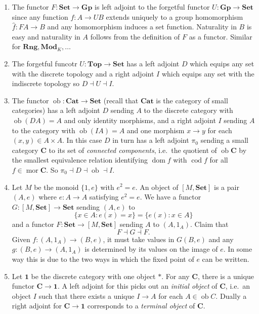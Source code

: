 \documentclass[a4paper]{article}
\renewcommand{\c}[1]{\mathbf{#1}}
\DeclareMathOperator{\ob}{ob}
\DeclareMathOperator{\mor}{mor}
\DeclareMathOperator{\dom}{dom}
\DeclareMathOperator{\cod}{cod}
\newcommand{\Set}{{\c{Set}}}
\newcommand{\Top}{{\c{Top}}}
\newcommand{\adjoint}{\dashv}
\begin{document}
\begin{eg}\leavevmode
  \begin{enumerate}
  \item The functor \(F: \Set \to \c{Gp}\) is left adjoint to the forgetful functor \(U: \c{Gp} \to \Set\) since any function \(f: A \to UB\) extends uniquely to a group homomorphism \(\hat f: FA \to B\) and any homomorphism induces a set function. Naturality in \(B\) is easy and naturality in \(A\) follows from the definition of \(F\) as a functor. Similar for \(\c{Rng}, \c{Mod}_K, \dots\)
  \item The forgetful funcotr \(U: \Top \to \Set\) has a left adjoint \(D\) which equips any set with the discrete topology and a right adjoint \(I\) which equips any set with the indiscrete topology so \(D \adjoint U \adjoint I\).
  \item The functor \(\ob: \c{Cat} \to \Set\) (recall that \(\c{Cat}\) is the category of small categories) has a left adjoint \(D\) sending \(A\) to the discrete category with \(\ob(DA) = A\) and only identity morphisms, and a right adjoint \(I\) sending \(A\) to the category with \(\ob(IA) = A\) and one morphism \(x \to y\) for each \((x, y) \in A \times A\). In this case \(D\) in turn has a left adjoint \(\pi_0\) sending a small category \(\c C\) to its set of \emph{connected components}, i.e.\ the quotient of \(\ob \c C\) by the smallest equivalence relation identifying \(\dom f\) with \(\cod f\) for all \(f \in \mor \c C\). So \(\pi_0 \adjoint D \adjoint \ob \adjoint I\).
  \item Let \(M\) be the monoid \(\{1, e\}\) with \(e^2 = e\). An object of \([M, \Set]\) is a pair \((A, e)\) where \(e: A \to A\) satisfying \(e^2 = e\). We have a functor \(G: [M, \Set] \to \Set\) sending \((A, e)\) to
    \[
      \{x \in A: e(x) = x\} = \{e(x): x \in A\}
    \]
    and a functor \(F: \Set \to [M, \Set]\) sending \(A\) to \((A, 1_A)\). Claim that
    \[
      F \adjoint G \adjoint F.
    \]
    Given \(f: (A, 1_A) \to (B, e)\), it must take values in \(G(B, e)\) and any \(g: (B, e) \to (A, 1_A)\) is determined by its values on the image of \(e\). In some way this is due to the two ways in which the fixed point of \(e\) can be written.
  \item Let \(\c 1\) be the discrete category with one object \(*\). For any \(\c C\), there is a unique functor \(\c C \to \c 1\). A left adjoint for this picks out an \emph{initial object} of \(\c C\), i.e.\ an object \(I\) such that there exists a unique \(I \to A\) for each \(A \in \ob C\). Dually a right adjoint for \(\c C \to \c 1\) corresponds to a \emph{terminal object} of \(\c C\).

\end{enumerate}
\end{eg}
\end{document}
